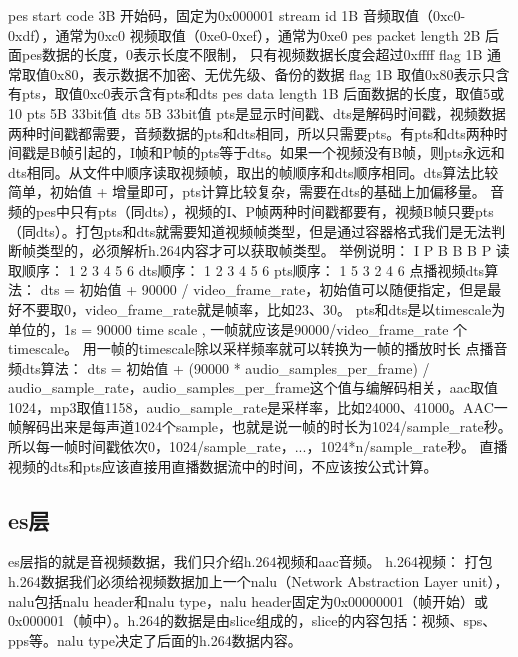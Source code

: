 \documentclass[bachelor]{thesis-uestc}
\begin{document}
pes start code	3B	开始码，固定为0x000001
stream id	1B	音频取值（0xc0-0xdf），通常为0xc0
视频取值（0xe0-0xef），通常为0xe0
pes packet length	2B	后面pes数据的长度，0表示长度不限制，
只有视频数据长度会超过0xffff
flag	1B	通常取值0x80，表示数据不加密、无优先级、备份的数据
flag	1B	取值0x80表示只含有pts，取值0xc0表示含有pts和dts
pes data length	1B	后面数据的长度，取值5或10
pts	5B	33bit值
dts	5B	33bit值
     pts是显示时间戳、dts是解码时间戳，视频数据两种时间戳都需要，音频数据的pts和dts相同，所以只需要pts。有pts和dts两种时间戳是B帧引起的，I帧和P帧的pts等于dts。如果一个视频没有B帧，则pts永远和dts相同。从文件中顺序读取视频帧，取出的帧顺序和dts顺序相同。dts算法比较简单，初始值 + 增量即可，pts计算比较复杂，需要在dts的基础上加偏移量。
     音频的pes中只有pts（同dts），视频的I、P帧两种时间戳都要有，视频B帧只要pts（同dts）。打包pts和dts就需要知道视频帧类型，但是通过容器格式我们是无法判断帧类型的，必须解析h.264内容才可以获取帧类型。
举例说明：
                         I          P          B          B          B          P
读取顺序：         1         2          3          4          5          6
dts顺序：           1         2          3          4          5          6
pts顺序：           1         5          3          2          4          6
点播视频dts算法：
dts = 初始值 + 90000 / video\_frame\_rate，初始值可以随便指定，但是最好不要取0，video\_frame\_rate就是帧率，比如23、30。
pts和dts是以timescale为单位的，1s = 90000 time scale , 一帧就应该是90000/video\_frame\_rate 个timescale。
用一帧的timescale除以采样频率就可以转换为一帧的播放时长
点播音频dts算法：
dts = 初始值 + (90000 * audio\_samples\_per\_frame) / audio\_sample\_rate，audio\_samples\_per\_frame这个值与编解码相关，aac取值1024，mp3取值1158，audio\_sample\_rate是采样率，比如24000、41000。AAC一帧解码出来是每声道1024个sample，也就是说一帧的时长为1024/sample\_rate秒。所以每一帧时间戳依次0，1024/sample\_rate，...，1024*n/sample\_rate秒。
直播视频的dts和pts应该直接用直播数据流中的时间，不应该按公式计算。


\subsection{es层}

     es层指的就是音视频数据，我们只介绍h.264视频和aac音频。
h.264视频：
     打包h.264数据我们必须给视频数据加上一个nalu（Network Abstraction Layer unit），nalu包括nalu header和nalu type，nalu header固定为0x00000001（帧开始）或0x000001（帧中）。h.264的数据是由slice组成的，slice的内容包括：视频、sps、pps等。nalu type决定了后面的h.264数据内容。
\end{document}
